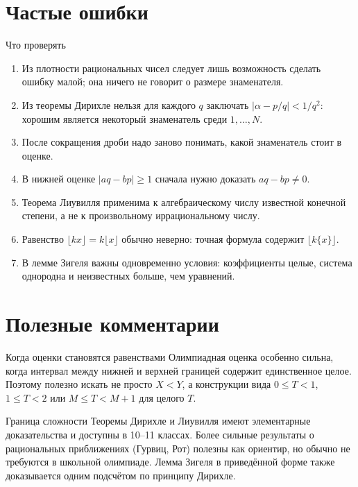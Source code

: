 \section{Частые ошибки}

\begin{warningbox}{Что проверять}
\begin{enumerate}
  \item Из плотности рациональных чисел следует лишь возможность сделать
        ошибку малой; она ничего не говорит о размере знаменателя.
  \item Из теоремы Дирихле нельзя для каждого $q$ заключать
        $|\alpha-p/q|<1/q^2$: хорошим является некоторый знаменатель
        среди $1,\ldots,N$.
  \item После сокращения дроби надо заново понимать, какой знаменатель
        стоит в оценке.
  \item В нижней оценке $|aq-bp|\ge1$ сначала нужно доказать
        $aq-bp\ne0$.
  \item Теорема Лиувилля применима к алгебраическому числу известной
        конечной степени, а не к произвольному иррациональному числу.
  \item Равенство $\lfloor kx\rfloor=k\lfloor x\rfloor$ обычно неверно:
        точная формула содержит $\lfloor k\{x\}\rfloor$.
  \item В лемме Зигеля важны одновременно условия: коэффициенты целые,
        система однородна и неизвестных больше, чем уравнений.
\end{enumerate}
\end{warningbox}

\section{Полезные комментарии}

\begin{commentbox}{Когда оценки становятся равенствами}
Олимпиадная оценка особенно сильна, когда интервал между нижней и
верхней границей содержит единственное целое. Поэтому полезно искать
не просто $X<Y$, а конструкции вида $0\le T<1$, $1\le T<2$ или
$M\le T<M+1$ для целого $T$.
\end{commentbox}

\begin{commentbox}{Граница сложности}
Теоремы Дирихле и Лиувилля имеют элементарные доказательства и доступны
в 10--11 классах. Более сильные результаты о рациональных приближениях
(Гурвиц, Рот) полезны как ориентир, но обычно не требуются в школьной
олимпиаде. Лемма Зигеля в приведённой форме также доказывается одним
подсчётом по принципу Дирихле.
\end{commentbox}

